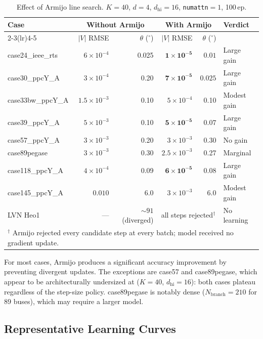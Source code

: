 \documentclass{article}
\begin{document}
\begin{table}[h]
\centering
\caption{Effect of Armijo line search. $K=40$, $d=4$, $d_{\mathrm{hi}}=16$,
  \texttt{numattn}$=1$, 100\,ep.}
\label{tab:armijo}
\begin{tabular}{lrrrrl}
\toprule
\multirow{2}{*}{Case} & \multicolumn{2}{c}{Without Armijo} & \multicolumn{2}{c}{With Armijo} & \multirow{2}{*}{Verdict} \\
\cmidrule(lr){2-3}\cmidrule(lr){4-5}
& $|V|$ RMSE & $\theta$ (${}^\circ$) & $|V|$ RMSE & $\theta$ (${}^\circ$) & \\
\midrule
case24\_ieee\_rts & $6\times10^{-4}$ & 0.025 & $\mathbf{1\times10^{-5}}$ & $\mathbf{0.01}$ & Large gain \\
case30\_ppcY\_A   & $3\times10^{-4}$ & 0.20  & $\mathbf{7\times10^{-5}}$ & $\mathbf{0.025}$ & Large gain \\
case33bw\_ppcY\_A & $1.5\times10^{-3}$ & 0.10 & $5\times10^{-4}$ & 0.10 & Modest gain \\
case39\_ppcY\_A   & $5\times10^{-3}$ & 0.10  & $\mathbf{5\times10^{-5}}$ & $\mathbf{0.07}$ & Large gain \\
case57\_ppcY\_A   & $3\times10^{-3}$ & 0.20  & $3\times10^{-3}$ & 0.30 & No gain \\
case89pegase      & $3\times10^{-3}$ & 0.30  & $2.5\times10^{-3}$ & 0.27 & Marginal \\
case118\_ppcY\_A  & $4\times10^{-4}$ & 0.09  & $\mathbf{6\times10^{-5}}$ & $\mathbf{0.08}$ & Large gain \\
case145\_ppcY\_A  & $0.010$ & 6.0   & $3\times10^{-3}$ & 6.0  & Modest gain \\
LVN Heo1         & --- & $\sim91$ (diverged) & \multicolumn{2}{c}{all steps rejected$^\dagger$} & No learning \\
\bottomrule
\multicolumn{6}{l}{${}^\dagger$ Armijo rejected every candidate step at every batch; model received no gradient update.}\\
\end{tabular}
\end{table}

For most cases, Armijo produces a significant accuracy improvement by
preventing divergent updates.  The exceptions are case57 and case89pegase,
which appear to be architecturally undersized at ($K=40$, $d_{\mathrm{hi}}=16$):
both cases plateau regardless of the step-size policy.  case89pegase is
notably dense ($N_{\mathrm{branch}}=210$ for 89 buses), which may
require a larger model.

\subsection{Representative Learning Curves}
\end{document}
